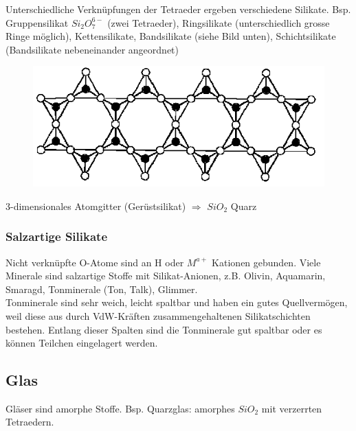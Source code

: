 Unterschiedliche Verknüpfungen der Tetraeder ergeben verschiedene Silikate. Bsp. Gruppensilikat $Si_2O_7^{6-}$ (zwei Tetraeder), Ringsilikate (unterschiedlich grosse Ringe möglich), Kettensilikate, Bandsilikate  (siehe Bild unten), Schichtsilikate (Bandsilikate nebeneinander angeordnet)

\begin{figure}[htbp]
	\centering
	\includegraphics[width=0.7\linewidth]{images/8_Bandsilikat.png}
\end{figure}

3-dimensionales Atomgitter (Gerüstsilikat) $\Rightarrow$ $SiO_2$ Quarz

\subsubsection{Salzartige Silikate}
Nicht verknüpfte O-Atome sind an H oder $M^{a+}$ Kationen gebunden. Viele Minerale sind salzartige Stoffe mit Silikat-Anionen, z.B. Olivin, Aquamarin, Smaragd, Tonminerale (Ton, Talk), Glimmer. \\

Tonminerale sind sehr weich, leicht spaltbar und haben ein gutes Quellvermögen, weil diese aus durch VdW-Kräften zusammengehaltenen Silikatschichten bestehen. Entlang dieser Spalten sind die Tonminerale gut spaltbar oder es können Teilchen eingelagert werden. 

\subsection{Glas}
Gläser sind amorphe Stoffe. Bsp. Quarzglas: amorphes $SiO_2$ mit verzerrten Tetraedern.